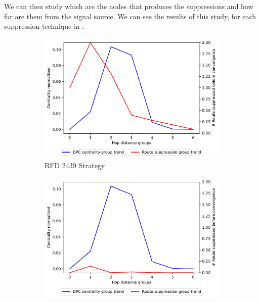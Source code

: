 We can then study which are the nodes that produces the suppressions and how
far are them from the signal source.
We can see the results of this study, for each suppression technique in .

\begin{figure}[h]
     \centering
     \begin{subfigure}[b]{0.325\textwidth}
         \centering
         \includegraphics[width=\textwidth]{images/RFD/miceVSelephants/mice/cisco_1000_RFD_nodeConvergence_centVSsup_trend.pdf}
         \caption{RFD 2439 Strategy}
         \label{fig:1000_2439RFD_centVSsup}
     \end{subfigure}
     \hfill
     \begin{subfigure}[b]{0.325\textwidth}
         \centering
         \includegraphics[width=\textwidth]{images/RFD/miceVSelephants/mice/cisco_1000_RFD_7196_aggressive_nodeConvergence_centVSsup_trend.pdf}

\end{subfigure}
\end{figure}
